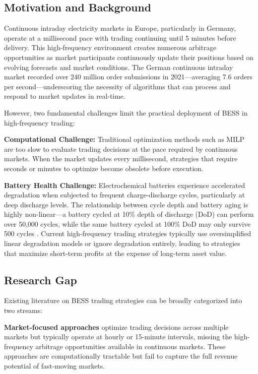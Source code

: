 \documentclass[10pt,twocolumn]{article}
\begin{document}
\subsection{Motivation and Background}

Continuous intraday electricity markets in Europe, particularly in Germany, operate at a millisecond pace with trading continuing until 5 minutes before delivery. This high-frequency environment creates numerous arbitrage opportunities as market participants continuously update their positions based on evolving forecasts and market conditions. The German continuous intraday market recorded over 240 million order submissions in 2021—averaging 7.6 orders per second—underscoring the necessity of algorithms that can process and respond to market updates in real-time.

However, two fundamental challenges limit the practical deployment of BESS in high-frequency trading:

\textbf{Computational Challenge:} Traditional optimization methods such as MILP are too slow to evaluate trading decisions at the pace required by continuous markets. When the market updates every millisecond, strategies that require seconds or minutes to optimize become obsolete before execution.

\textbf{Battery Health Challenge:} Electrochemical batteries experience accelerated degradation when subjected to frequent charge-discharge cycles, particularly at deep discharge levels. The relationship between cycle depth and battery aging is highly non-linear—a battery cycled at 10\% depth of discharge (DoD) can perform over 50,000 cycles, while the same battery cycled at 100\% DoD may only survive 500 cycles \cite{xu2017factoring}. Current high-frequency trading strategies typically use oversimplified linear degradation models or ignore degradation entirely, leading to strategies that maximize short-term profits at the expense of long-term asset value.

\subsection{Research Gap}

Existing literature on BESS trading strategies can be broadly categorized into two streams:

\textbf{Market-focused approaches} \cite{braeuer2019battery, seifert2024coordinated} optimize trading decisions across multiple markets but typically operate at hourly or 15-minute intervals, missing the high-frequency arbitrage opportunities available in continuous markets. These approaches are computationally tractable but fail to capture the full revenue potential of fast-moving markets.
\end{document}
